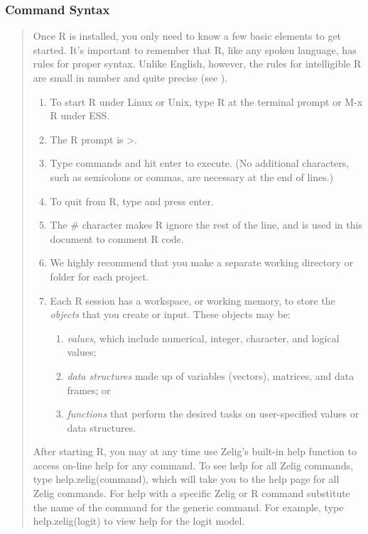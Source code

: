 \documentclass[letterpaper,10pt,english]{sphinxmanual}
\begin{document}
\subsubsection{Command Syntax}
\label{docs/user_guide:command-syntax}\begin{quote}

Once R is installed, you only need to know a few basic elements to get
started. It’s important to remember that R, like any spoken language,
has rules for proper syntax. Unlike English, however, the rules for
intelligible R are small in number and quite precise (see ).
\begin{enumerate}
\item {} 
To start R under Linux or Unix, type R at the terminal prompt or M-x
R under ESS.

\item {} 
The R prompt is \textgreater{}.

\item {} 
Type commands and hit enter to execute. (No additional characters,
such as semicolons or commas, are necessary at the end of lines.)

\item {} 
To quit from R, type  and press enter.

\item {} 
The \# character makes R ignore the rest of the line, and is used in
this document to comment R code.

\item {} 
We highly recommend that you make a separate working directory or
folder for each project.

\item {} 
Each R session has a workspace, or working memory, to store the
\emph{objects} that you create or input. These objects may be:
\begin{enumerate}
\item {} 
\emph{values}, which include numerical, integer, character, and logical
values;

\item {} 
\emph{data structures} made up of variables (vectors), matrices, and
data frames; or

\item {} 
\emph{functions} that perform the desired tasks on user-specified
values or data structures.

\end{enumerate}

\end{enumerate}

After starting R, you may at any time use Zelig’s built-in help function
to access on-line help for any command. To see help for all Zelig
commands, type help.zelig(command), which will take you to the help page
for all Zelig commands. For help with a specific Zelig or R command
substitute the name of the command for the generic command. For example,
type help.zelig(logit) to view help for the logit model.
\end{quote}
\end{document}

